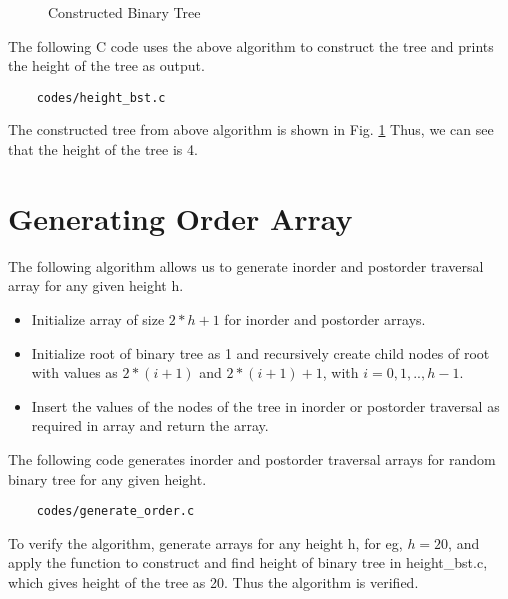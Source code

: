 \documentclass[journal,12pt,twocolumn]{IEEEtran}
\begin{document}
\begin{figure}[!ht]
\centering

\caption{Constructed Binary Tree}
\label{fig:bst}
\end{figure}
The following C code uses the above algorithm to construct the tree and prints the height of the tree as output. 
\begin{lstlisting}
    codes/height_bst.c
\end{lstlisting}
The constructed tree from above algorithm is shown in Fig. \ref{fig:bst}
\newline
Thus, we can see that the height of the tree is 4.

\section{Generating Order Array}
The following algorithm allows us to generate inorder and postorder traversal array for any given height h.
\begin{itemize}
    \item Initialize array of size $2*h + 1$ for inorder and postorder arrays.
    \item Initialize root of binary tree as 1 and recursively create child nodes of root with values as $2*(i+1)$ and $2*(i+1)+1$, with $i=0,1,..,h-1$.
    \item Insert the values of the nodes of the tree in inorder or postorder traversal as required in array and return the array.
\end{itemize}

The following code generates inorder and postorder traversal arrays for random binary tree for any given height.
\begin{lstlisting}
    codes/generate_order.c
\end{lstlisting}

To verify the algorithm, generate arrays for any height h, for eg, $h = 20$, and apply the function to construct and find height of binary tree in height\_bst.c, which gives height of the tree as 20.
Thus the algorithm is verified.
\end{document}

